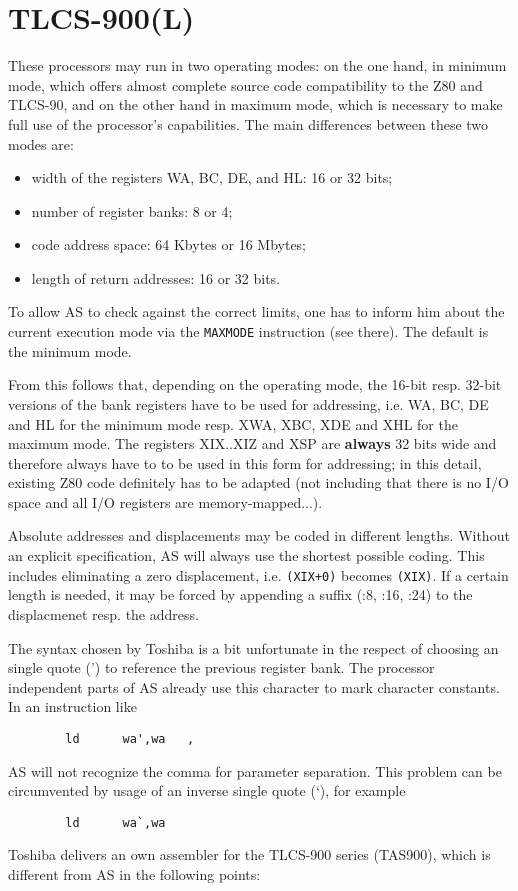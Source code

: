 \documentclass[12pt,twoside]{report}
\newcommand{\bb}[1]{{\bf #1}}
\newcommand{\tty}[1]{{\tt #1}}
\newcommand{\asname}{{AS}}
\begin{document}

\section{TLCS-900(L)}
\label{TLCS900Spec}

These processors may run in two operating modes: on the one hand, in
minimum mode, which offers almost complete source code compatibility
to the Z80 and TLCS-90, and on the other hand in maximum mode, which
is necessary to make full use of the processor's capabilities.  The
main differences between these two modes are:
\begin{itemize}
\item{width of the registers WA, BC, DE, and HL: 16 or 32 bits;}
\item{number of register banks: 8 or 4;}
\item{code address space: 64 Kbytes or 16 Mbytes;}
\item{length of return addresses: 16 or 32 bits.}
\end{itemize}
To allow \asname{} to check against the correct limits, one has to inform him
about the current execution mode via the \tty{MAXMODE} instruction (see
there).  The default is the minimum mode.

From this follows that, depending on the operating mode, the 16-bit
resp. 32-bit versions of the bank registers have to be used for
addressing, i.e. WA, BC, DE and HL for the minimum mode resp. XWA,
XBC, XDE and XHL for the maximum mode.  The registers XIX..XIZ and
XSP are \bb{always} 32 bits wide and therefore always have to to be used
in this form for addressing; in this detail, existing Z80 code
definitely has to be adapted (not including that there is no I/O
space and all I/O registers are memory-mapped...).

Absolute addresses and displacements may be coded in different
lengths.  Without an explicit specification, \asname{} will always use
the shortest possible coding.  This includes eliminating a zero
displacement, i.e. \verb!(XIX+0)! becomes \verb!(XIX)!.  If a certain
length is needed, it may be forced by appending a suffix (:8, :16,
:24) to the displacmenet resp. the address.

The syntax chosen by Toshiba is a bit unfortunate in the respect of
choosing an single quote (') to reference the previous register bank.  The
processor independent parts of \asname{} already use this character to mark
character constants.  In an instruction like
\begin{verbatim}
        ld      wa',wa   ,
\end{verbatim}
\asname{} will not recognize the comma for parameter separation.  This
problem can be circumvented by usage of an inverse single quote (`), for
example
\begin{verbatim}
        ld      wa`,wa
\end{verbatim}
Toshiba delivers an own assembler for the TLCS-900 series (TAS900),
which is different from \asname{} in the following points:
\end{document}
